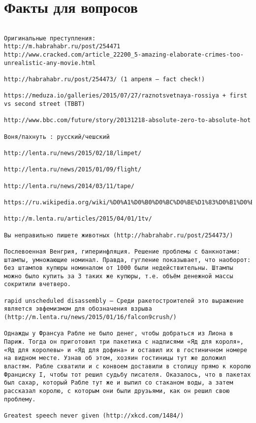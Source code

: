 \documentclass[a4paper,10pt]{article}
\begin{document}
\section{Факты для вопросов}

\begin{verbatim}

Оригинальные преступления:
http://m.habrahabr.ru/post/254471
http://www.cracked.com/article_22200_5-amazing-elaborate-crimes-too-unrealistic-any-movie.html

http://habrahabr.ru/post/254473/ (1 апреля — fact check!)

https://meduza.io/galleries/2015/07/27/raznotsvetnaya-rossiya + first vs second street (TBBT)

http://www.bbc.com/future/story/20131218-absolute-zero-to-absolute-hot

Воня/пахнуть : русский/чешский

http://lenta.ru/news/2015/02/18/limpet/

http://lenta.ru/news/2015/01/09/flight/

http://lenta.ru/news/2014/03/11/tape/

https://ru.wikipedia.org/wiki/%D0%A1%D0%B0%D0%BC%D0%BE%D1%83%D0%B1%D0%B8%D0%B9%D1%81%D1%82%D0%B2%D0%BE_%D0%A0%D0%BE%D0%BD%D0%B0%D0%BB%D0%B4%D0%B0_%D0%9E%D0%BF%D1%83%D1%81%D0%B0

http://m.lenta.ru/articles/2015/04/01/1tv/

Вы неправильно пишете животных (http://habrahabr.ru/post/254473/)

Послевоенная Венгрия, гиперинфляция. Решение проблемы с банкнотами: штампы, умножающие номинал. Правда, гугление показывает, что наоборот: без штампов купюры номиналом от 1000 были недействительны. Штампы можно было купить за 3 таких же купюры, т.е. объём денежной массы сокритили вчетверо.

rapid unscheduled disassembly — Среди ракетостроителей это выражение является эвфемизмом для обозначения взрыва (http://m.lenta.ru/news/2015/01/16/falcon9crush/)

Однажды у Франсуа Рабле не было денег, чтобы добраться из Лиона в Париж. Тогда он приготовил три пакетика с надписями «Яд для короля», «Яд для королевы» и «Яд для дофина» и оставил их в гостиничном номере на видном месте. Узнав об этом, хозяин гостиницы тут же доложил властям. Рабле схватили и с конвоем доставили в столицу прямо к королю Франциску I, чтобы тот решил судьбу писателя. Оказалось, что в пакетах был сахар, который Рабле тут же и выпил со стаканом воды, а затем рассказал королю, с которым они были друзьями, как он решил свою проблему.

Greatest speech never given (http://xkcd.com/1484/)

\end{verbatim}
\end{document}
